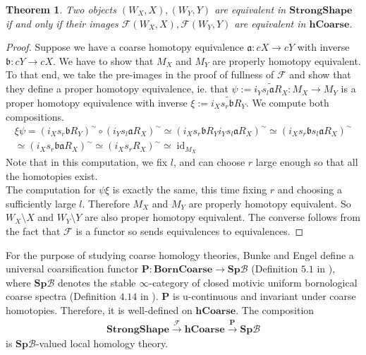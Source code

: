 \documentclass[a4paper,11pt]{article}
\theoremstyle{definition}
\theoremstyle{plain}
\newtheorem{theorem}[definition]{Theorem}
\theoremstyle{remark}
\DeclareMathOperator{\id}{id}
\begin{document}
{\begin{theorem} \label{SSBornCoarse2} Two objects $(W_{X},X),(W_{Y},Y)$ are equivalent in $\mathbf{StrongShape}$ if and only if their images $\mathcal{F}(W_{X},X),\mathcal{F}(W_{Y},Y)$ are equivalent in $\mathbf{hCoarse}$. 
\end{theorem}
\begin{proof} Suppose we have a coarse homotopy equivalence $\mathfrak{a}:cX\rightarrow cY$ with inverse $\mathfrak{b}: cY\rightarrow cX$. We have to show that $M_{X}$ and $M_{Y}$ are properly homotopy equivalent. To that end, we take the pre-images in the proof of fullness of $\mathcal{F}$ and show that they define a proper homotopy equivalence, ie. that $\psi:=\widetilde{i_{Y}s_{l}\mathfrak{a}R_{X}}: M_{X}\rightarrow M_{Y}$ is a proper homotopy equivalence with inverse $\xi:= \widetilde{i_{X}s_{r}\mathfrak{b} R_{Y}}$. We compute both compositions.
\begin{align*}
\xi\psi=(i_{X}s_{r}\mathfrak{b} R_{Y})^{\sim}\circ ({i_{Y}s_{l}\mathfrak{a}R_{X}})^{\sim}\simeq (i_{X}s_{r}\mathfrak{b} R_{Y} i_{Y}s_{l}\mathfrak{a}R_{X})^{\sim} \simeq (i_{X}s_{r}\mathfrak{b} s_{l}\mathfrak{a}R_{X})^{\sim} \\
\simeq (i_{X}s_{r}\mathfrak{b}\mathfrak{a}R_{X})^{\sim} \simeq (i_{X}s_{r}R_{X})^{\sim} \simeq \id_{M_{X}}
\end{align*}
Note that in this computation, we fix $l$, and can choose $r$ large enough so that all the homotopies exist. \\

The computation for $\psi \xi$ is exactly the same, this time fixing $r$ and choosing a sufficiently large $l$. Therefore $M_{X}$ and $M_{Y}$ are properly homotopy equivalent. So $W_{X}\setminus X$ and $W_{Y}\setminus Y$ are also proper homotopy equivalent. The converse follows from the fact that $\mathcal{F}$ is a functor so sends equivalences to equivalences. 
\end{proof}

For the purpose of studying coarse homology theories, Bunke and Engel define a universal coarsification functor $\mathbf{P}: \mathbf{BornCoarse} \rightarrow \mathbf{Sp}\mathcal{B}$ (Definition $5.1$ in \cite{bunke2020coarse}), where $\mathbf{Sp}\mathcal{B}$ denotes the stable $\infty$-category of closed motivic uniform bornological coarse spectra (Definition $4.14$ in \cite{bunke2020coarse}). $\mathbf{P}$ is u-continuous and invariant under coarse homotopies. Therefore, it is well-defined on $\mathbf{hCoarse}$. The composition
\begin{align*}
\mathbf{StrongShape}\xrightarrow{\mathcal{F}} \mathbf{hCoarse} \xrightarrow{\mathbf{P}} \mathbf{Sp} \mathcal{B}
\end{align*}
is $\mathbf{Sp} \mathcal{B}$-valued local homology theory. \\

}
\end{document}
